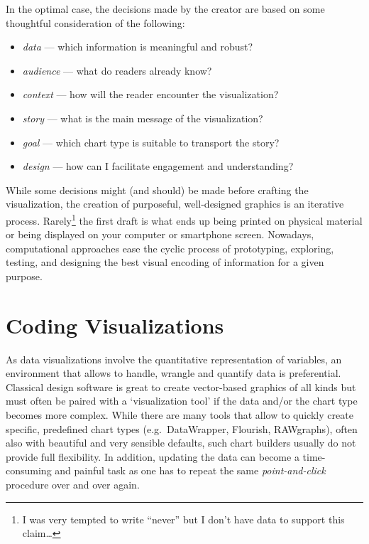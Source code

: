 \documentclass[
]{krantz}
\providecommand{\tightlist}{%
  \setlength{\itemsep}{0pt}\setlength{\parskip}{0pt}}
\begin{document}
In the optimal case, the decisions made by the creator are based on some thoughtful consideration of the following:

\begin{itemize}
\tightlist
\item
  \emph{data} --- which information is meaningful and robust?
\item
  \emph{audience} --- what do readers already know?
\item
  \emph{context} --- how will the reader encounter the visualization?
\item
  \emph{story} --- what is the main message of the visualization?
\item
  \emph{goal} --- which chart type is suitable to transport the story?
\item
  \emph{design} --- how can I facilitate engagement and understanding?
\end{itemize}

While some decisions might (and should) be made before crafting the visualization, the creation of purposeful, well-designed graphics is an iterative process. Rarely\footnote{I was very tempted to write ``never'' but I don't have data to support this claim\ldots{}} the first draft is what ends up being printed on physical material or being displayed on your computer or smartphone screen. Nowadays, computational approaches ease the cyclic process of prototyping, exploring, testing, and designing the best visual encoding of information for a given purpose.

\hypertarget{coding}{%
\section{Coding Visualizations}\label{coding}}

As data visualizations involve the quantitative representation of variables, an environment that allows to handle, wrangle and quantify data is preferential. Classical design software is great to create vector-based graphics of all kinds but must often be paired with a `visualization tool' if the data and/or the chart type becomes more complex. While there are many tools that allow to quickly create specific, predefined chart types (e.g.~DataWrapper, Flourish, RAWgraphs), often also with beautiful and very sensible defaults, such chart builders usually do not provide full flexibility. In addition, updating the data can become a time-consuming and painful task as one has to repeat the same \emph{point-and-click} procedure over and over again.
\end{document}
